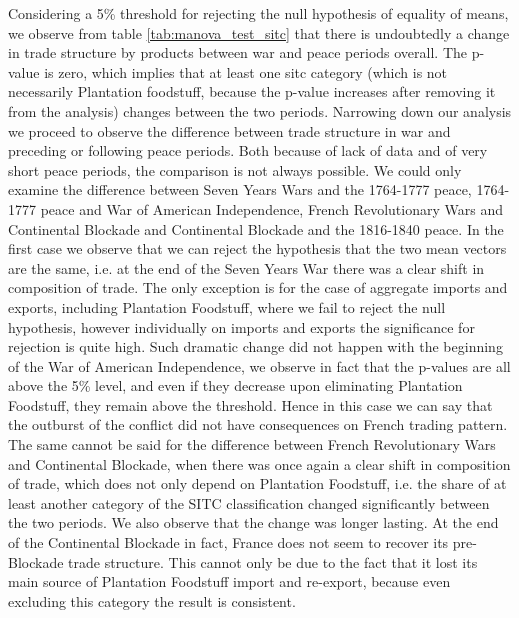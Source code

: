 \documentclass[12pt,a4paper,notitlepage,english]{article}
\begin{document}
Considering a 5\% threshold for rejecting the null hypothesis of equality of means, we observe from table \ref{tab:manova_test_sitc} that there is undoubtedly a change in trade structure by products between war and peace periods overall. The p-value is zero, which implies that at least one sitc category (which is not necessarily Plantation foodstuff, because the p-value increases after removing it from the analysis) changes between the two periods. Narrowing down our analysis we proceed to observe the difference between trade structure in war and preceding or following peace periods. Both because of lack of data and of very short peace periods, the comparison is not always possible. We could only examine the difference between Seven Years Wars and the 1764-1777 peace, 1764-1777 peace and War of American Independence, French Revolutionary Wars and Continental Blockade and Continental Blockade and the 1816-1840 peace. In the first case we observe that we can reject the hypothesis that the two mean vectors are the same, i.e. at the end of the Seven Years War there was a clear shift in composition of trade. The only exception is for the case of aggregate imports and exports, including Plantation Foodstuff, where we fail to reject the null hypothesis, however individually on imports and exports the significance for rejection is quite high. Such dramatic change did not happen with the beginning of the War of American Independence, we observe in fact that the p-values are all above the 5\% level, and even if they decrease upon eliminating Plantation Foodstuff, they remain above the threshold. Hence in this case we can say that the outburst of the conflict did not have consequences on French trading pattern. The same cannot be said for the difference between French Revolutionary Wars and Continental Blockade, when there was once again a clear shift in composition of trade, which does not only depend on Plantation Foodstuff, i.e. the share of at least another category of the SITC classification changed significantly between the two periods. We also observe that the change was longer lasting. At the end of the Continental Blockade in fact, France does not seem to recover its pre-Blockade trade structure. This cannot only be due to the fact that it lost its main source of Plantation Foodstuff import and re-export, because even excluding this category the result is consistent. 
\end{document}
